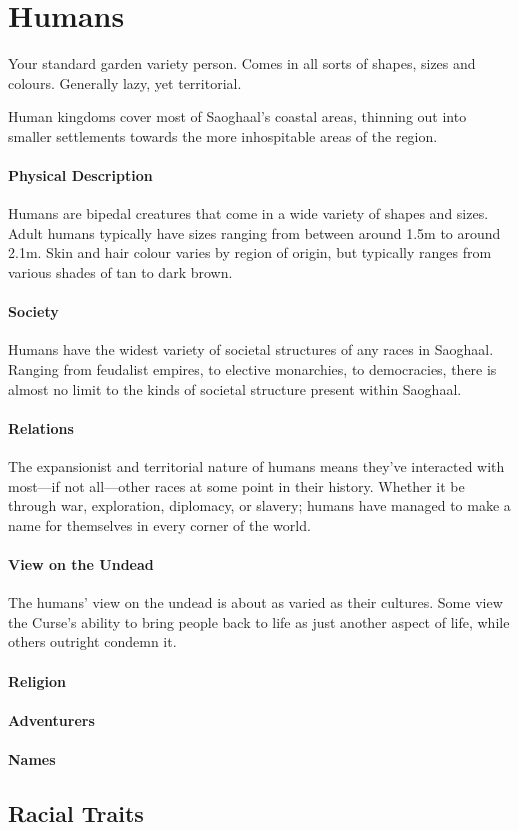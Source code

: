 \section{Humans}\label{sec:human}
Your standard garden variety person.
Comes in all sorts of shapes, sizes and colours.
Generally lazy, yet territorial.

Human kingdoms cover most of Saoghaal's coastal areas, thinning out into smaller settlements towards the more inhospitable areas of the region.

\paragraph{Physical Description}
Humans are bipedal creatures that come in a wide variety of shapes and sizes.
Adult humans typically have sizes ranging from between around 1.5m to around 2.1m.
Skin and hair colour varies by region of origin, but typically ranges from various shades of tan to dark brown.

\paragraph{Society}
Humans have the widest variety of societal structures of any races in Saoghaal.
Ranging from feudalist empires, to elective monarchies, to democracies, there is almost no limit to the kinds of societal structure present within Saoghaal.

\paragraph{Relations}
The expansionist and territorial nature of humans means they've interacted with most---if not all---other races at some point in their history.
Whether it be through war, exploration, diplomacy, or slavery; humans have managed to make a name for themselves in every corner of the world.

\paragraph{View on the Undead}
The humans' view on the undead is about as varied as their cultures.
Some view the Curse's ability to bring people back to life as just another aspect of life, while others outright condemn it.

\paragraph{Religion}
\paragraph{Adventurers}
\paragraph{Names}

\subsection{Racial Traits}
